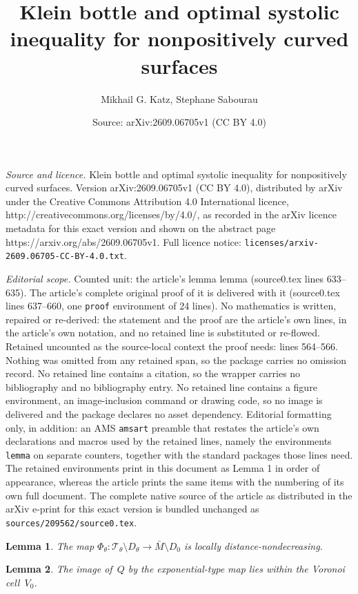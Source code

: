 \documentclass[10pt,a4paper]{amsart}
\title{Klein bottle and optimal systolic inequality for nonpositively curved surfaces}
\author{Mikhail G. Katz, Stephane Sabourau}
\date{Source: arXiv:2609.06705v1 (CC BY 4.0)}
\newtheorem{lemma}{Lemma}
\begin{document}
\maketitle

\noindent\emph{Source and licence.} Klein bottle and optimal systolic inequality for nonpositively curved surfaces. Version arXiv:2609.06705v1 (CC BY 4.0), distributed by arXiv under the Creative Commons Attribution 4.0 International licence, http://creativecommons.org/licenses/by/4.0/, as recorded in the arXiv licence metadata for this exact version and shown on the abstract page https://arxiv.org/abs/2609.06705v1. Full licence notice: \texttt{licenses/arxiv-2609.06705-CC-BY-4.0.txt}.\par\smallskip

\noindent\textit{Editorial scope.} Counted unit: the article's lemma lemma (source0.tex lines 633--635). The article's complete original proof of it is delivered with it (source0.tex lines 637--660, one \texttt{proof} environment of 24 lines). No mathematics is written, repaired or re-derived: the statement and the proof are the article's own lines, in the article's own notation, and no retained line is substituted or re-flowed.  Retained uncounted as the source-local context the proof needs: lines 564--566.  Nothing was omitted from any retained span, so the package carries no omission record.  No retained line contains a citation, so the wrapper carries no bibliography and no bibliography entry.  No retained line contains a figure environment, an image-inclusion command or drawing code, so no image is delivered and the package declares no asset dependency.  Editorial formatting only, in addition: an AMS \texttt{amsart} preamble that restates the article's own declarations and macros used by the retained lines, namely the environments \texttt{lemma} on separate counters, together with the standard packages those lines need.  The retained environments print in this document as Lemma 1 in order of appearance, whereas the article prints the same items with the numbering of its own full document.  The complete native source of the article as distributed in the arXiv e-print for this exact version is bundled unchanged as \texttt{sources/209562/source0.tex}.
\begin{lemma} \label{lem:noncontracting}
The map $\Phi_\theta: \mathcal{T}_\theta \setminus D_\theta \to \bar{M} \setminus D_0$ is locally distance-nondecreasing.
\end{lemma}

\begin{lemma}
The image of~$Q$ by the exponential-type map lies within the Voronoi cell~$V_0$.
\end{lemma}
\end{document}
